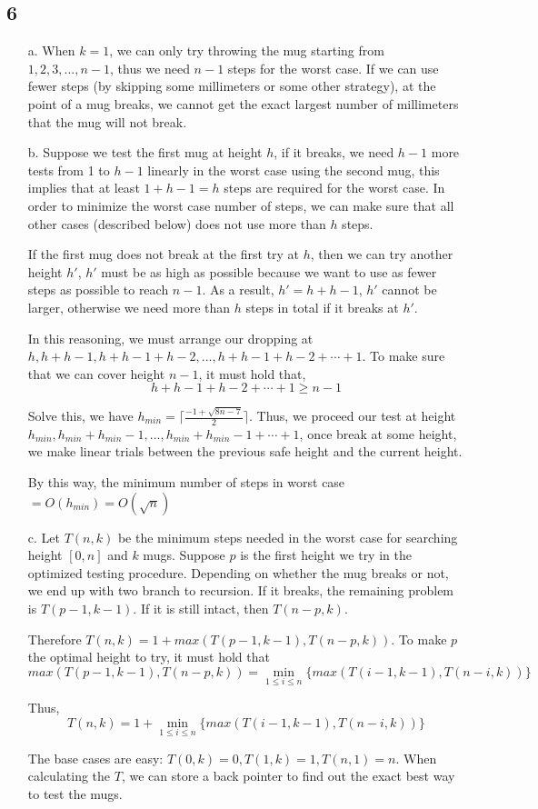 \documentclass[twoside]{homework}
\begin{document}
\subsection*{6}
\begin{enumerate}
	\item [a.] When $k=1$, we can only try throwing the mug starting from $1, 2, 3, ..., n-1$, thus we need $n-1$ steps for the worst case. If we can use fewer steps (by skipping some millimeters or some other strategy), at the point of a mug breaks, we cannot get the exact largest number of millimeters that the mug will not break.
	\item [b.] Suppose we test the first mug at height $h$, if it breaks, we need $h-1$ more tests from 1 to $h-1$ linearly in the worst case using the second mug, this implies that at least $1 + h -1 = h$ steps are required for the worst case. In order to minimize the worst case number of steps, we can make sure that all other cases (described below) does not use more than $h$ steps.

	If the first mug does not break at the first try at $h$, then we can try another height $h'$, $h'$ must be as high as possible because we want to use as fewer steps as possible to reach $n-1$. As a result, $h' = h + h -1$,
	$h'$ cannot be larger, otherwise we need more than $h$ steps in total if it breaks at $h'$.

	In this reasoning, we must arrange our dropping at $h, h + h - 1, h + h - 1 + h-2, ..., h + h-1 + h-2 + \cdots + 1$. To make sure that we can cover height $n-1$, it must hold that,
	\[ h + h-1 + h-2 + \cdots + 1 \geq n - 1\]

	Solve this, we have $h_{min} = \lceil\frac{-1 + \sqrt{8n-7}}{2}\rceil $. Thus, we proceed our test at height $h_{min}, h_{min} + h_{min} - 1, ..., h_{min} + h_{min} - 1 + \cdots + 1$, once break at some height, we make linear trials between the previous safe height and the current height.

	By this way, the minimum number of steps in worst case $=O(h_{min}) = O(\sqrt{n})$
	\item [c.] Let $T(n, k)$ be the minimum steps needed in the worst case for searching height $[0, n]$ and $k$ mugs. Suppose $p$ is the first height we try in the optimized testing procedure.
	Depending on whether the mug breaks or not, we end up with two branch to recursion. If it breaks, the remaining problem is $T(p-1, k-1)$. If it is still intact, then $T(n-p, k)$.

	Therefore $T(n, k) = 1 + max(T(p-1, k-1), T(n-p, k))$. To make $p$ the optimal height to try, it must hold that
	\[max(T(p-1, k-1), T(n-p, k)) = \min_{1 \leq i \leq n}\{max(T(i-1, k-1), T(n-i, k))\}\]

	Thus,
	\[ T(n, k) = 1 + \min_{1 \leq i \leq n}\{max(T(i-1, k-1), T(n-i, k))\}\]

	The base cases are easy: $T(0, k) = 0, T(1, k) = 1, T(n, 1) = n$. When calculating the $T$, we can store a back pointer to find out the exact best way to test the mugs.
\end{enumerate}
\end{document}
